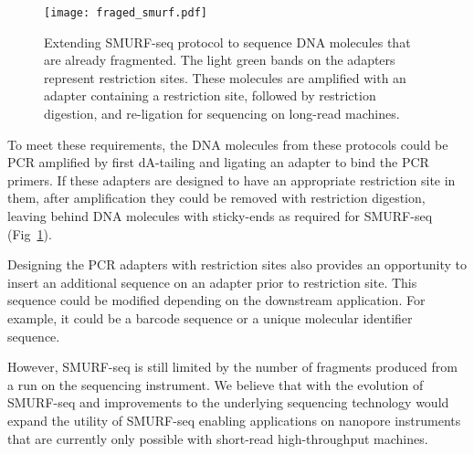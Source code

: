 \begin{figure}[t!]
\centering
\texttt{[image: fraged\_smurf.pdf]}
\caption{Extending SMURF-seq protocol to sequence DNA molecules that are
  already fragmented. The light green bands
  on the adapters represent restriction sites. These molecules are
  amplified with an adapter containing a restriction site, followed by
  restriction digestion, and re-ligation for sequencing on long-read
  machines.}
\label{fraged_smurf}
\end{figure}

To meet these requirements, the DNA molecules from these protocols
could be PCR amplified by first dA-tailing and
ligating an adapter to bind the PCR primers. If these adapters are
designed to have an
appropriate restriction site in them, after amplification they could be
removed with restriction digestion, leaving behind DNA molecules with
sticky-ends as required for SMURF-seq (Fig~\ref{fraged_smurf}).

Designing the PCR adapters with restriction sites  also provides an
opportunity to insert an additional sequence on an adapter prior to
restriction site. This sequence could be modified depending on the
downstream application. For example, it could be a barcode sequence or a
unique molecular identifier sequence.

However, SMURF-seq is still limited by the number of fragments produced
from a run on the sequencing instrument. We believe that with the
evolution of SMURF-seq and improvements to the underlying sequencing
technology would expand the utility of SMURF-seq enabling applications
on nanopore instruments that are currently only possible with short-read
high-throughput machines.
